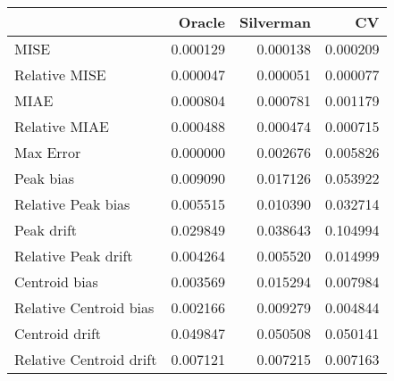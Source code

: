 \begin{tabular}{lrrr}
  \hline
 & Oracle & Silverman & CV \\ 
  \hline
MISE & 0.000129 & 0.000138 & 0.000209 \\ 
  Relative MISE & 0.000047 & 0.000051 & 0.000077 \\ 
  MIAE & 0.000804 & 0.000781 & 0.001179 \\ 
  Relative MIAE & 0.000488 & 0.000474 & 0.000715 \\ 
  Max Error & 0.000000 & 0.002676 & 0.005826 \\ 
  Peak bias & 0.009090 & 0.017126 & 0.053922 \\ 
  Relative Peak bias & 0.005515 & 0.010390 & 0.032714 \\ 
  Peak drift & 0.029849 & 0.038643 & 0.104994 \\ 
  Relative Peak drift & 0.004264 & 0.005520 & 0.014999 \\ 
  Centroid bias & 0.003569 & 0.015294 & 0.007984 \\ 
  Relative Centroid bias & 0.002166 & 0.009279 & 0.004844 \\ 
  Centroid drift & 0.049847 & 0.050508 & 0.050141 \\ 
  Relative Centroid drift & 0.007121 & 0.007215 & 0.007163 \\ 
   \hline
\end{tabular}
